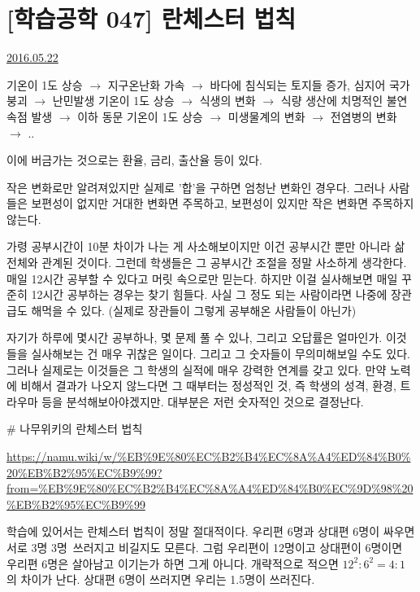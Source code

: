\section{[학습공학 047] 란체스터 법칙}
\href{https://www.kockoc.com/Apoc/788196}{2016.05.22}

\vspace{5mm}

기온이 1도 상승 $\rightarrow$ 지구온난화 가속 $\rightarrow$ 바다에 침식되는 토지들 증가, 심지어 국가 붕괴 $\rightarrow$ 난민발생
기온이 1도 상승 $\rightarrow$ 식생의 변화 $\rightarrow$ 식량 생산에 치명적인 불연속점 발생 $\rightarrow$ 이하 동문
기온이 1도 상승 $\rightarrow$ 미생물계의 변화 $\rightarrow$ 전염병의 변화 $\rightarrow$ ..
\vspace{5mm}

이에 버금가는 것으로는 환율, 금리, 출산율 등이 있다.
\vspace{5mm}

작은 변화로만 알려져있지만 실제로 '합'을 구하면 엄청난 변화인 경우다.
그러나 사람들은 보편성이 없지만 거대한 변화면 주목하고, 보편성이 있지만 작은 변화면 주목하지 않는다.
\vspace{5mm}

가령 공부시간이 10분 차이가 나는 게 사소해보이지만 이건 공부시간 뿐만 아니라 삶 전체와 관계된 것이다.
그런데 학생들은 그 공부시간 조절을 정말 사소하게 생각한다. 매일 12시간 공부할 수 있다고 머릿 속으로만 믿는다.
하지만 이걸 실사해보면 매일 꾸준히 12시간 공부하는 경우는 찾기 힘들다. 사실 그 정도 되는 사람이라면 나중에 장관급도 해먹을 수 있다.
(실제로 장관들이 그렇게 공부해온 사람들이 아닌가)
\vspace{5mm}

자기가 하루에 몇시간 공부하나, 몇 문제 풀 수 있나, 그리고 오답률은 얼마인가.
이것들을 실사해보는 건 매우 귀찮은 일이다. 그리고 그 숫자들이 무의미해보일 수도 있다.
그러나 실제로는 이것들은 그 학생의 실적에 매우 강력한 연계를 갖고 있다.
만약 노력에 비해서 결과가 나오지 않느다면 그 때부터는 정성적인 것, 즉 학생의 성격, 환경, 트라우마 등을 분석해보아야겠지만.
대부분은 저런 숫자적인 것으로 결정난다.
\vspace{5mm}

$\#$ 나무위키의 란체스터 법칙
\vspace{5mm}

\url{https://namu.wiki/w/%EB%9E%80%EC%B2%B4%EC%8A%A4%ED%84%B0%20%EB%B2%95%EC%B9%99?from=%EB%9E%80%EC%B2%B4%EC%8A%A4%ED%84%B0%EC%9D%98%20%EB%B2%95%EC%B9%99}
\vspace{5mm}

학습에 있어서는 란체스터 법칙이 정말 절대적이다.
우리편 6명과 상대편 6명이 싸우면 서로 3명 3명 쓰러지고 비길지도 모른다.
그럼 우리편이 12명이고 상대편이 6명이면 우리편 6명은 살아남고 이기는가 하면 그게 아니다.
개략적으로 적으면 $12^2: 6^2 = 4 : 1$ 의 차이가 난다. 상대편 6명이 쓰러지면 우리는 1.5명이 쓰러진다.
\vspace{5mm}

